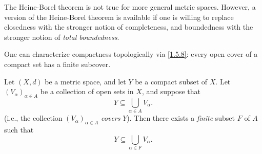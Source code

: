 \begin{note}
  The Heine-Borel theorem is not true for more general metric spaces.
  However, a version of the Heine-Borel theorem is available if one is willing to replace closedness with the stronger notion of completeness, and boundedness with the stronger notion of \emph{total boundedness}.
\end{note}

\begin{note}
  One can characterize compactness topologically via \cref{1.5.8}:
  every open cover of a compact set has a finite subcover.
\end{note}

\begin{thm}\label{1.5.8}
  Let \((X, d)\) be a metric space, and let \(Y\) be a compact subset of \(X\).
  Let \((V_{\alpha})_{\alpha \in A}\) be a collection of open sets in \(X\), and suppose that
  \[
    Y \subseteq \bigcup_{\alpha \in A} V_{\alpha}.
  \]
  (i.e., the collection \((V_{\alpha})_{\alpha \in A}\) \emph{covers} \(Y\)).
  Then there exists a \emph{finite} subset \(F\) of \(A\) such that
  \[
    Y \subseteq \bigcup_{\alpha \in F} V_{\alpha}.
  \]
\end{thm}

